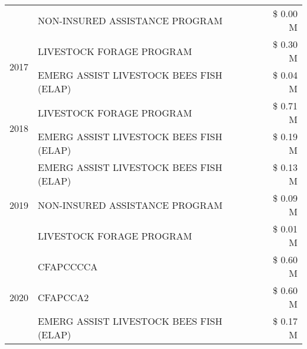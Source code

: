 \begin{tabular}{llr}
 & NON-INSURED ASSISTANCE PROGRAM & \$ 0.00 M \\
\cline{1-3}
\multirow[t]{2}{*}{2017} & LIVESTOCK FORAGE PROGRAM & \$ 0.30 M \\
 & EMERG ASSIST LIVESTOCK BEES FISH (ELAP) & \$ 0.04 M \\
\cline{1-3}
\multirow[t]{2}{*}{2018} & LIVESTOCK FORAGE PROGRAM & \$ 0.71 M \\
 & EMERG ASSIST LIVESTOCK BEES FISH (ELAP) & \$ 0.19 M \\
\cline{1-3}
\multirow[t]{3}{*}{2019} & EMERG ASSIST LIVESTOCK BEES FISH (ELAP) & \$ 0.13 M \\
 & NON-INSURED ASSISTANCE PROGRAM & \$ 0.09 M \\
 & LIVESTOCK FORAGE PROGRAM & \$ 0.01 M \\
\cline{1-3}
\multirow[t]{3}{*}{2020} & CFAPCCCCA & \$ 0.60 M \\
 & CFAPCCA2 & \$ 0.60 M \\
 & EMERG ASSIST LIVESTOCK BEES FISH (ELAP) & \$ 0.17 M \\
\cline{1-3}
\bottomrule
\end{tabular}

